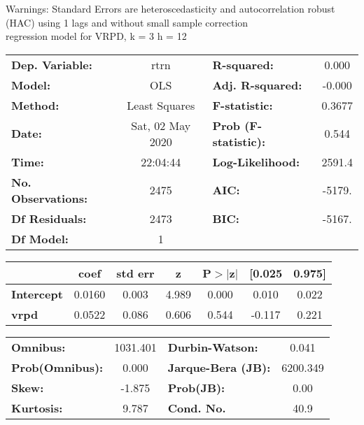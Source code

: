 Warnings: \newline
 [1] Standard Errors are heteroscedasticity and autocorrelation robust (HAC) using 1 lags and without small sample correction\\ 

regression model for VRPD, k = 3 h = 12\begin{center}
\begin{tabular}{lclc}
\toprule
\textbf{Dep. Variable:}    &       rtrn       & \textbf{  R-squared:         } &     0.000   \\
\textbf{Model:}            &       OLS        & \textbf{  Adj. R-squared:    } &    -0.000   \\
\textbf{Method:}           &  Least Squares   & \textbf{  F-statistic:       } &    0.3677   \\
\textbf{Date:}             & Sat, 02 May 2020 & \textbf{  Prob (F-statistic):} &    0.544    \\
\textbf{Time:}             &     22:04:44     & \textbf{  Log-Likelihood:    } &    2591.4   \\
\textbf{No. Observations:} &        2475      & \textbf{  AIC:               } &    -5179.   \\
\textbf{Df Residuals:}     &        2473      & \textbf{  BIC:               } &    -5167.   \\
\textbf{Df Model:}         &           1      & \textbf{                     } &             \\
\bottomrule
\end{tabular}
\begin{tabular}{lcccccc}
                   & \textbf{coef} & \textbf{std err} & \textbf{z} & \textbf{P$> |$z$|$} & \textbf{[0.025} & \textbf{0.975]}  \\
\midrule
\textbf{Intercept} &       0.0160  &        0.003     &     4.989  &         0.000        &        0.010    &        0.022     \\
\textbf{vrpd}      &       0.0522  &        0.086     &     0.606  &         0.544        &       -0.117    &        0.221     \\
\bottomrule
\end{tabular}
\begin{tabular}{lclc}
\textbf{Omnibus:}       & 1031.401 & \textbf{  Durbin-Watson:     } &    0.041  \\
\textbf{Prob(Omnibus):} &   0.000  & \textbf{  Jarque-Bera (JB):  } & 6200.349  \\
\textbf{Skew:}          &  -1.875  & \textbf{  Prob(JB):          } &     0.00  \\
\textbf{Kurtosis:}      &   9.787  & \textbf{  Cond. No.          } &     40.9  \\
\bottomrule
\end{tabular}
\end{center}

